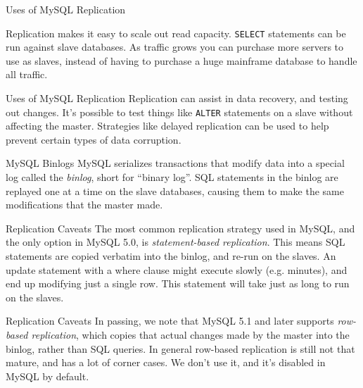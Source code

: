 \documentclass[14pt]{beamer}
\begin{document}
\begin{frame}{Uses of MySQL Replication}

  Replication makes it easy to scale out read capacity.
  \newline
  \newline
  \texttt{SELECT}
  statements can be run against slave databases. As traffic grows you can
  purchase more servers to use as slaves, instead of having to purchase a huge
  mainframe database to handle all traffic.

\end{frame}

\begin{frame}{Uses of MySQL Replication}
  Replication can assist in data recovery, and testing out changes. It's
  possible to test things like \texttt{ALTER} statements on a slave without
  affecting the master.
  \newline
  \newline
  Strategies like delayed replication can be used to help
  prevent certain types of data corruption.
\end{frame}

\begin{frame}{MySQL Binlogs}
  MySQL serializes transactions that modify data into a special log called the
  \emph{binlog}, short for ``binary log''.
  \newline
  \newline
  SQL statements in the binlog are replayed one at a time on the slave
  databases, causing them to make the same modifications that the master made.
\end{frame}

\begin{frame}{Replication Caveats}
  The most common replication strategy used in MySQL, and the only option in
  MySQL 5.0, is \emph{statement-based replication}. This means SQL statements
  are copied verbatim into the binlog, and re-run on the slaves.
  \newline
  \newline
  An update statement with a where clause might execute slowly (e.g. minutes),
  and end up modifying just a single row. This statement will take just as long
  to run on the slaves.
\end{frame}

\begin{frame}{Replication Caveats}
  In passing, we note that MySQL 5.1 and later supports \emph{row-based
    replication}, which copies that actual changes made by the master into the
  binlog, rather than SQL queries.
  \newline
  \newline
  In general row-based replication is still not that mature, and has a lot of
  corner cases. We don't use it, and it's disabled in MySQL by default.
\end{frame}
\end{document}
